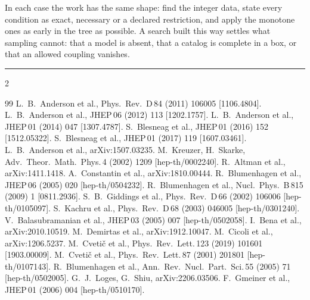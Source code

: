 \documentclass[10pt,a4paper]{article}
\begin{document}
\smallskip
In each case the work has the same shape: find the integer data, state every
condition as exact, necessary or a declared restriction, and apply the monotone
ones as early in the tree as possible. A search built this way settles what
sampling cannot: that a model is absent, that a catalog is complete in a box,
or that an allowed coupling vanishes.

\vspace{-2pt}
\noindent\rule{\textwidth}{0.4pt}
\vspace{-14pt}
{\scriptsize
\renewcommand{\section}[2]{}
\begin{multicols}{2}
\begin{thebibliography}{99}
\setlength{\itemsep}{0pt}\setlength{\parsep}{0pt}
 L.~B.~Anderson et al., Phys.\ Rev.\ D\,84 (2011) 106005 [1106.4804].
 L.~B.~Anderson et al., JHEP\,06 (2012) 113 [1202.1757].
 L.~B.~Anderson et al., JHEP\,01 (2014) 047 [1307.4787].
 S.~Blesneag et al., JHEP\,01 (2016) 152 [1512.05322].
 S.~Blesneag et al., JHEP\,01 (2017) 119 [1607.03461].
 L.~B.~Anderson et al., arXiv:1507.03235.
 M.~Kreuzer, H.~Skarke, Adv.\ Theor.\ Math.\ Phys.\,4 (2002) 1209 [hep-th/0002240].
 R.~Altman et al., arXiv:1411.1418.
 A.~Constantin et al., arXiv:1810.00444.
 R.~Blumenhagen et al., JHEP\,06 (2005) 020 [hep-th/0504232].
 R.~Blumenhagen et al., Nucl.\ Phys.\ B\,815 (2009) 1 [0811.2936].
 S.~B.~Giddings et al., Phys.\ Rev.\ D\,66 (2002) 106006 [hep-th/0105097].
 S.~Kachru et al., Phys.\ Rev.\ D\,68 (2003) 046005 [hep-th/0301240].
 V.~Balasubramanian et al., JHEP\,03 (2005) 007 [hep-th/0502058].
 I.~Bena et al., arXiv:2010.10519.
 M.~Demirtas et al., arXiv:1912.10047.
 M.~Cicoli et al., arXiv:1206.5237.
 M.~Cveti\v{c} et al., Phys.\ Rev.\ Lett.\,123 (2019) 101601 [1903.00009].
 M.~Cveti\v{c} et al., Phys.\ Rev.\ Lett.\,87 (2001) 201801 [hep-th/0107143].
 R.~Blumenhagen et al., Ann.\ Rev.\ Nucl.\ Part.\ Sci.\,55 (2005) 71 [hep-th/0502005].
 G.~J.~Loges, G.~Shiu, arXiv:2206.03506.
 F.~Gmeiner et al., JHEP\,01 (2006) 004 [hep-th/0510170].
\end{thebibliography}
\end{multicols}}
\end{document}
